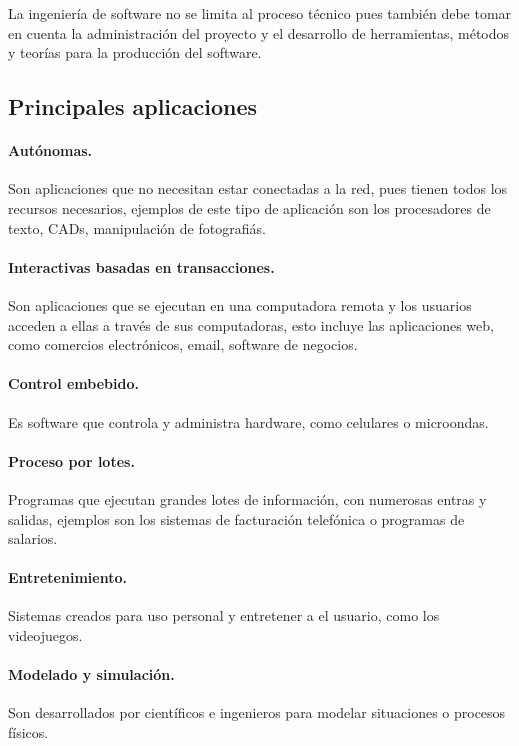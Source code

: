 \documentclass[spanish,12pt,letterpapper]{article}
\begin{document}
	La ingeniería de software no se limita al proceso técnico pues también debe tomar en cuenta la administración del proyecto y el desarrollo de herramientas, métodos y teorías para la producción del software.\\
	
	
	\subsection{Principales aplicaciones}
	
	\paragraph{Autónomas.} Son aplicaciones que no necesitan estar conectadas a la red, pues tienen todos los recursos necesarios, ejemplos de este tipo de aplicación son los procesadores de texto, CADs, manipulación de fotografiás.
	
	\paragraph{Interactivas basadas en transacciones.} Son aplicaciones que se ejecutan en una computadora remota y los usuarios acceden a ellas a través de sus computadoras, esto incluye las aplicaciones web, como comercios electrónicos, email, software de negocios.
	
	\paragraph{Control embebido.} Es software que controla y administra hardware, como celulares o microondas.
	
	\paragraph{Proceso por lotes.} Programas que ejecutan grandes lotes de información, con numerosas entras y salidas, ejemplos son los sistemas de facturación telefónica o programas de salarios.
	
	\paragraph{Entretenimiento.} Sistemas creados para uso personal y entretener a el usuario, como los videojuegos.
	
	\paragraph{Modelado y simulación.} Son desarrollados por científicos e ingenieros para modelar situaciones o procesos físicos.
	
\end{document}
